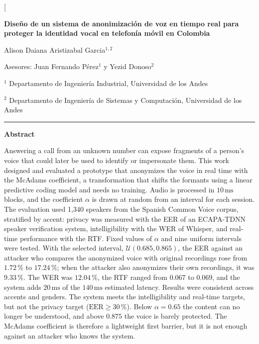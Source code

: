 \documentclass[10pt,twocolumn]{article}
\begin{document}
\twocolumn[
\begin{@twocolumnfalse}
\raggedright
{\LARGE\bfseries Diseño de un sistema de anonimización de voz en tiempo real para proteger la identidad vocal en telefonía móvil en Colombia\par}
\vspace{10pt}
{\large Alison Daiana Aristizabal Garcia$^{1,2}$\par}
\vspace{2pt}
{\large Asesores: Juan Fernando Pérez$^{1}$ y Yezid Donoso$^{2}$\par}
\vspace{8pt}
{\small $^{1}$ Departamento de Ingeniería Industrial, Universidad de los Andes\par
$^{2}$ Departamento de Ingeniería de Sistemas y Computación, Universidad de los Andes\par}
\vspace{8pt}\rule{\textwidth}{0.4pt}\vspace{5pt}


\noindent\textbf{Abstract}\par
\vspace{4pt}

\noindent Answering a call from an unknown number can expose fragments of a person's voice that could later be used to identify or impersonate them. This work designed and evaluated a prototype that anonymizes the voice in real time with the McAdams coefficient, a transformation that shifts the formants using a linear predictive coding model and needs no training. Audio is processed in $10\,\mathrm{ms}$ blocks, and the coefficient $\alpha$ is drawn at random from an interval for each session. The evaluation used 1,340 speakers from the Spanish Common Voice corpus, stratified by accent: privacy was measured with the EER of an ECAPA-TDNN speaker verification system, intelligibility with the WER of Whisper, and real-time performance with the RTF. Fixed values of $\alpha$ and nine uniform intervals were tested. With the selected interval, $\mathcal{U}(0.685,0.865)$, the EER against an attacker who compares the anonymized voice with original recordings rose from $1.72\,\%$ to $17.24\,\%$; when the attacker also anonymizes their own recordings, it was $9.33\,\%$. The WER was $12.04\,\%$, the RTF ranged from $0.067$ to $0.069$, and the system adds $20\,\mathrm{ms}$ of the $140\,\mathrm{ms}$ estimated latency. Results were consistent across accents and genders. The system meets the intelligibility and real-time targets, but not the privacy target ($\mathrm{EER}\geq 30\,\%$). Below $\alpha=0.65$ the content can no longer be understood, and above $0.875$ the voice is barely protected. The McAdams coefficient is therefore a lightweight first barrier, but it is not enough against an attacker who knows the system.


\end{@twocolumnfalse}
\end{document}
